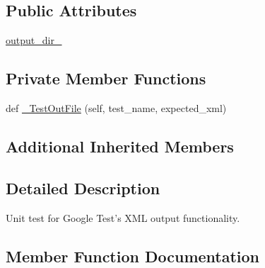 \subsection*{Public Attributes}
\begin{DoxyCompactItemize}
\item 
\mbox{\hyperlink{classgoogletest-master_1_1googletest_1_1test_1_1gtest__xml__outfiles__test_1_1_g_test_x_m_l_out_files_test_a19232df231f1820531f5f36d60e7dcc0}{output\+\_\+dir\+\_\+}}
\end{DoxyCompactItemize}
\subsection*{Private Member Functions}
\begin{DoxyCompactItemize}
\item 
def \mbox{\hyperlink{classgoogletest-master_1_1googletest_1_1test_1_1gtest__xml__outfiles__test_1_1_g_test_x_m_l_out_files_test_a4d3cc21bb5257990466977dfe84cad69}{\+\_\+\+Test\+Out\+File}} (self, test\+\_\+name, expected\+\_\+xml)
\end{DoxyCompactItemize}
\subsection*{Additional Inherited Members}


\subsection{Detailed Description}
\begin{DoxyVerb}Unit test for Google Test's XML output functionality.\end{DoxyVerb}
 

\subsection{Member Function Documentation}
\mbox{\label{classgoogletest-master_1_1googletest_1_1test_1_1gtest__xml__outfiles__test_1_1_g_test_x_m_l_out_files_test_a4d3cc21bb5257990466977dfe84cad69}} 
